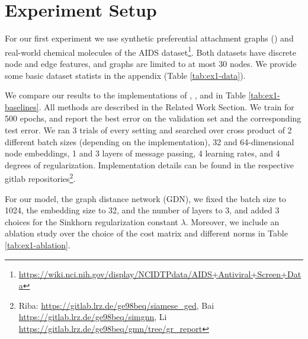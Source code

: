 \section{Experiment Setup}

For our first experiment we use synthetic preferential attachment graphs (\citealp{pref_att2002}) and real-world chemical molecules of the AIDS dataset\footnote{\url{https://wiki.nci.nih.gov/display/NCIDTPdata/AIDS+Antiviral+Screen+Data}}. Both datasets have discrete node and edge features, and graphs are limited to at most 30 nodes. We provide some basic dataset statists in the appendix (Table \ref{tab:ex1-data}).

We compare our results to the implementations of \cite{riba2018}, \cite{bai2019}, and \cite{li2019} in Table \ref{tab:ex1-baselines}. All methods are described in the Related Work Section. We train for 500 epochs, and report the best error on the validation set and the corresponding test error. We ran 3 trials of every setting and searched over cross product of 2 different batch sizes (depending on the implementation), 32 and 64-dimensional node embeddings, 1 and 3 layers of message passing, 4 learning rates, and 4 degrees of regularization. Implementation details can be found in the respective gitlab repositories\footnote{Riba: \url{https://gitlab.lrz.de/ge98beq/siamese_ged}, Bai \url{https://gitlab.lrz.de/ge98beq/simgnn}, Li \url{https://gitlab.lrz.de/ge98beq/gmn/tree/gr_report}}.

For our model, the graph distance network (GDN), we fixed the batch size to 1024, the embedding size to 32, and the number of layers to 3, and added 3 choices for the Sinkhorn regularization constant $\lambda$. Moreover, we include an ablation study over the choice of the cost matrix and different norms in Table \ref{tab:ex1-ablation}.
